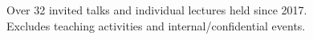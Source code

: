 \newcommand{\talkref}[4]{``#3'' (#2).\\\textit{#4}}
\newcommand{\talkrefwnote}[5]{``#3'' (#2).\\\textit{#4, (#5)}}

\ifdefined\shortcv
    {
        \hspace*{\fill} Over 32 invited talks and individual lectures held since 2017.\\
        \hspace*{\fill} Excludes teaching activities and internal/confidential events.
    }
\else
    {
        
        
    }
\fi


